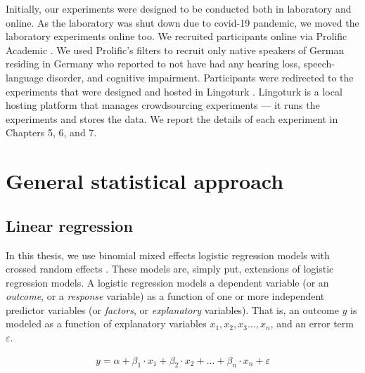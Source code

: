 \documentclass[a4paper, nobind]{templates/ociamthesis}
\renewcommand{\chaptermark}[1]{\markboth{\thechapter. #1}{\thechapter. #1}}
\begin{document}
Initially, our experiments were designed to be conducted both in laboratory and online.
As the laboratory was shut down due to covid-19 pandemic, we moved the laboratory experiments online too.
We recruited participants online via Prolific Academic \autocite{Prolific}.
We used Prolific's filters to recruit only native speakers of German residing in Germany
who reported to not have had any hearing loss, speech-language disorder, and cognitive impairment.
Participants were redirected to the experiments that were designed and hosted in Lingoturk \autocite{Pusse2016}.
Lingoturk is a local hosting platform that manages crowdsourcing experiments --- it runs the experiments and stores the data.
We report the details of each experiment in Chapters 5, 6, and 7.

\hypertarget{general-statistical-approach}{%
\chapter{General statistical approach}\label{general-statistical-approach}}

\chaptermark{Statistics}

\hypertarget{linear-regression}{%
\section{Linear regression}\label{linear-regression}}

In this thesis, we use binomial mixed effects logistic regression models with crossed random effects \autocite{Baayen2008}.
These models are, simply put, extensions of logistic regression models.
A logistic regression models a dependent variable (or an \emph{outcome}, or a \emph{response} variable) as a function of one or more independent predictor variables (or \emph{factors}, or \emph{explanatory} variables).
That is, an outcome \(y\) is modeled as a function of explanatory variables \(x_1, x_2, x_3..., x_n\), and an error term \(\varepsilon\).

\begin{align} \label{eq:linear_regression}
y =
\alpha + 
\beta_{1}\cdot{x_1} + 
\beta_{2}\cdot{x_2} + ... +
\beta_{n}\cdot{x_n} + \varepsilon 
\end{align}
\end{document}
